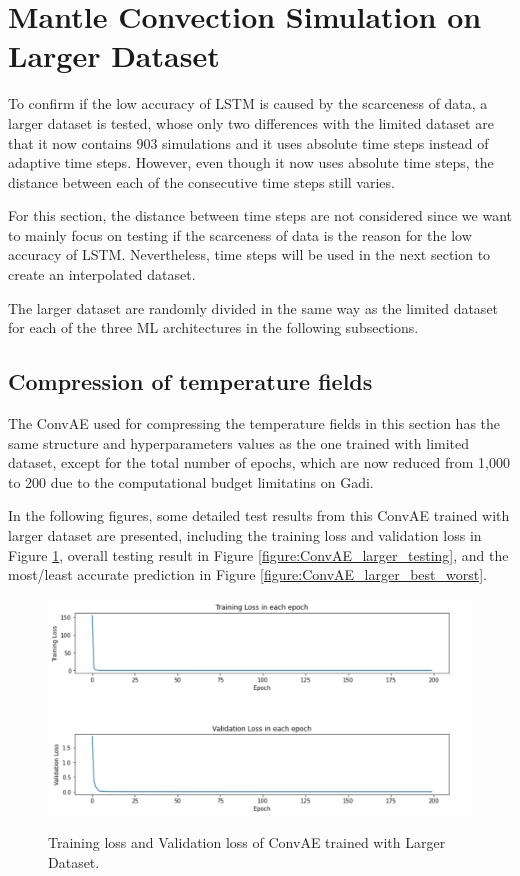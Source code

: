 \section{Mantle Convection Simulation on Larger Dataset}

To confirm if the low accuracy of LSTM is caused by the scarceness of data, a larger dataset is tested, whose only two differences with the limited dataset are that it now contains 903 simulations and it uses absolute time steps instead of adaptive time steps. However, even though it now uses absolute time steps, the distance between each of the consecutive time steps still varies.

For this section, the distance between time steps are not considered since we want to mainly focus on testing if the scarceness of data is the reason for the low accuracy of LSTM. Nevertheless, time steps will be used in the next section to create an interpolated dataset.

The larger dataset are randomly divided in the same way as the limited dataset for each of the three ML architectures in the following subsections.

\subsection{Compression of temperature fields}

The ConvAE used for compressing the temperature fields in this section has the same structure and hyperparameters values as the one trained with limited dataset, except for the total number of epochs, which are now reduced from 1,000 to 200 due to the computational budget limitatins on Gadi.

In the following figures, some detailed test results from this ConvAE trained with larger dataset are presented, including the training loss and validation loss in Figure \ref{figure:ConvAE_larger_losses}, overall testing result in Figure \ref{figure:ConvAE_larger_testing}, and the most/least accurate prediction in Figure \ref{figure:ConvAE_larger_best_worst}.

\begin{figure}[H]
    \caption{Training loss and Validation loss of ConvAE trained with Larger Dataset.}
    \includegraphics[scale=0.6]{figures/mantle_convection_images/larger_dataset/ConvAE_trainingData.png}
    \label{figure:ConvAE_larger_losses}
\end{figure}

